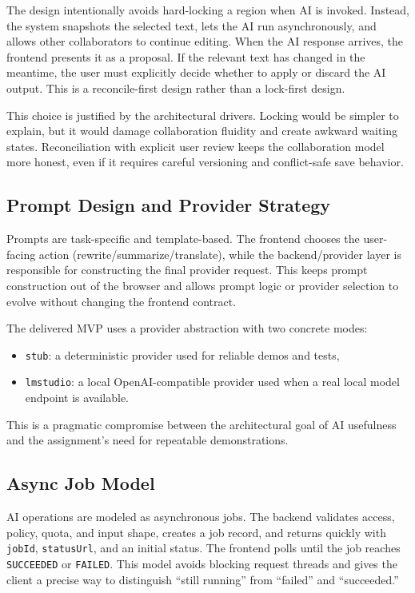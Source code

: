 The design intentionally avoids hard-locking a region when AI is invoked. Instead, the system snapshots
the selected text, lets the AI run asynchronously, and allows other collaborators to continue editing.
When the AI response arrives, the frontend presents it as a proposal. If the relevant text has changed in
the meantime, the user must explicitly decide whether to apply or discard the AI output. This is a
reconcile-first design rather than a lock-first design.

This choice is justified by the architectural drivers. Locking would be simpler to explain, but it would
damage collaboration fluidity and create awkward waiting states. Reconciliation with explicit user review
keeps the collaboration model more honest, even if it requires careful versioning and conflict-safe save
behavior.

\subsection{Prompt Design and Provider Strategy}

Prompts are task-specific and template-based. The frontend chooses the user-facing action
(rewrite/summarize/translate), while the backend/provider layer is responsible for constructing the final
provider request. This keeps prompt construction out of the browser and allows prompt logic or provider
selection to evolve without changing the frontend contract.

The delivered MVP uses a provider abstraction with two concrete modes:

\begin{itemize}
  \item \texttt{stub}: a deterministic provider used for reliable demos and tests,
  \item \texttt{lmstudio}: a local OpenAI-compatible provider used when a real local model endpoint is
  available.
\end{itemize}

This is a pragmatic compromise between the architectural goal of AI usefulness and the assignment's need
for repeatable demonstrations.

\subsection{Async Job Model}

AI operations are modeled as asynchronous jobs. The backend validates access, policy, quota, and input
shape, creates a job record, and returns quickly with \texttt{jobId}, \texttt{statusUrl}, and an initial
status. The frontend polls until the job reaches \texttt{SUCCEEDED} or \texttt{FAILED}. This model avoids
blocking request threads and gives the client a precise way to distinguish “still running” from “failed”
and “succeeded.”


